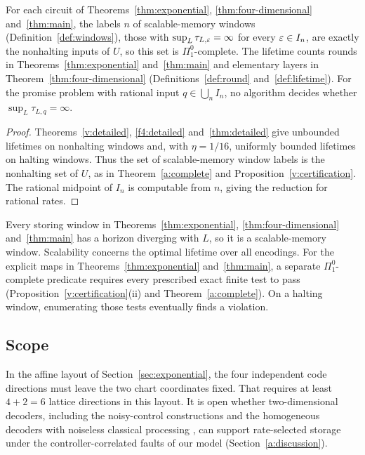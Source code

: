 \begin{corollary}\label{cor:window-undecidable}
For each circuit of Theorems~\ref{thm:exponential}, \ref{thm:four-dimensional}
and~\ref{thm:main}, the labels \(n\) of scalable-memory windows (Definition~\ref{def:windows}),
those with \(\sup_L\tau_{L,\varepsilon}=\infty\) for every \(\varepsilon\in I_n\),
are exactly the nonhalting inputs of \(U\), so this set is \(\Pi^0_1\)-complete.
The lifetime counts rounds in Theorems~\ref{thm:exponential} and~\ref{thm:main} and elementary layers in Theorem~\ref{thm:four-dimensional}
(Definitions~\ref{def:round} and~\ref{def:lifetime}). For the promise problem with rational input
\(q\in\bigcup_n I_n\), no algorithm decides whether \(\sup_L\tau_{L,q}=\infty\).
\end{corollary}
\begin{proof}
Theorems~\ref{v:detailed}, \ref{f4:detailed} and~\ref{thm:detailed}
give unbounded lifetimes on nonhalting windows and, with \(\eta=1/16\),
uniformly bounded lifetimes on halting windows. Thus the set of scalable-memory window labels
is the nonhalting set of \(U\), as in Theorem~\ref{a:complete}
and Proposition~\ref{v:certification}. The rational midpoint of \(I_n\)
is computable from \(n\), giving the reduction for rational rates.
\end{proof}
Every storing window in Theorems~\ref{thm:exponential}, \ref{thm:four-dimensional} and~\ref{thm:main} has a horizon diverging with \(L\), so it is a scalable-memory window. Scalability concerns the optimal lifetime over all encodings. For the explicit maps in Theorems~\ref{thm:exponential} and~\ref{thm:main}, a separate \(\Pi^0_1\)-complete predicate requires every prescribed exact finite test to pass (Proposition~\ref{v:certification}(ii) and Theorem~\ref{a:complete}). On a halting window, enumerating those tests eventually finds a violation.

\subsection{Scope}\label{intro:scope}
In the affine layout of Section~\ref{sec:exponential}, the four independent code directions must leave the two chart coordinates fixed. That requires at least \(4+2=6\) lattice directions in this layout. It is open whether two-dimensional decoders, including the noisy-control constructions \cite{BDL2026,DST2026} and the homogeneous decoders with noiseless classical processing \cite{Lake2025,SBL2026}, can support rate-selected storage under the controller-correlated faults of our model (Section~\ref{a:discussion}).

